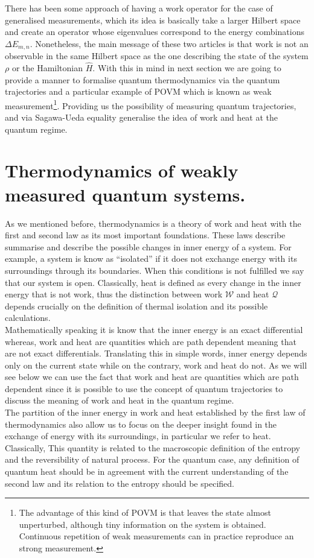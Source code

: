 There has been some approach of having a work operator for the case of generalised measurements, which its idea is basically take a larger Hilbert space and create an operator whose eigenvalues correspond to the energy combinations $\Delta E_{m,n}$. Nonetheless, the main message of these two articles is that work is not an observable in the same Hilbert space as the one describing the state of the system $\rho$ or the Hamiltonian $\hat{H}$. With this in mind in next section we are going to provide a manner to formalise quantum thermodynamics via the quantum trajectories and a particular example of POVM which is known as weak measurement\footnote{The advantage of this kind of POVM is that leaves the state almost unperturbed, although tiny information on the system is obtained. Continuous repetition of weak measurements can in practice reproduce an strong measurement.}. Providing us the possibility of measuring quantum trajectories, and via Sagawa-Ueda equality generalise the idea of work and heat at the quantum regime.
\section{Thermodynamics of weakly measured quantum systems.} 
As we mentioned before, thermodynamics is a theory of work and heat with the first and second law as its most important foundations. These laws describe summarise and describe the possible changes in inner energy of a system. For example, a system is know as ``isolated'' if it does not exchange energy with its surroundings through its boundaries. When this conditions is not fulfilled we say that our system is open. Classically, heat is defined as every change in the inner energy that is not work, thus the distinction between work $\mathcal{W}$ and heat $\mathcal{Q}$ depends crucially on the definition of thermal isolation and its possible calculations.\\
Mathematically speaking it is know that the inner energy is an exact differential whereas, work and heat are quantities which are path dependent meaning that are not exact differentials. Translating this in simple words, inner energy depends only on the current state while on the contrary, work and heat do not.
As we will see below we can use the fact that work and heat are quantities which are path dependent since it is possible to use the concept of quantum trajectories to discuss the meaning of work and heat in the quantum regime.\\
The partition of the inner energy  in work and heat established by the first law of thermodynamics also allow us to focus on the deeper insight found in the exchange of energy with its surroundings, in particular we refer to heat. Classically, This quantity is related to the macroscopic definition of the entropy and the reversibility of natural process. For the quantum case, any definition of quantum heat should be in agreement with the current understanding of the second law  and its relation to the entropy should be specified.
